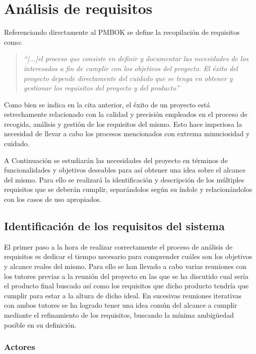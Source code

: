 \chapter{Análisis de requisitos}

Referenciando directamente al PMBOK \cite{pmbok} se define la recopilación de requisitos como:

\begin{quote}
	\textit{
	“[...]el proceso que consiste en definir y documentar las necesidades de los interesados
	a fin de cumplir con los objetivos del proyecto. El éxito del proyecto depende directamente
	del cuidado que se tenga en obtener y gestionar los requisitos del proyecto y del
	producto”
	}
\end{quote}

Como bien se indica en la cita anterior, el éxito de un proyecto está estrechamente relacionado con la calidad y precisión empleados en el proceso de recogida, análisis y gestión de los requisitos del mismo. Esto hace imperiosa la necesidad de llevar a cabo los procesos mencionados con extrema minuciosidad y cuidado.

\bigskip

A Continuación se estudiarán las necesidades del proyecto en términos de funcionalidades y objetivos deseables para así obtener una idea sobre el alcance del mismo. Para ello se realizará la identificación y descripción de los múltiples requisitos que se deberán cumplir, separándolos según su índole y relacionándolos con los casos de uso apropiados.

\section{Identificación de los requisitos del sistema}

El primer paso a la hora de realizar correctamente el proceso de análisis de requisitos es dedicar el tiempo necesario para comprender cuáles son los objetivos y alcance reales del mismo. Para ello se han llevado a cabo varias reuniones con los tutores previas a la reunión del proyecto en las que se ha discutido cual sería el producto final buscado así como los requisitos que dicho producto tendría que cumplir para estar a la altura de dicho ideal. En sucesivas reuniones iterativas con ambos tutores se ha logrado tener una idea común del alcance a cumplir mediante el refinamiento de los requisitos, buscando la mínima ambigüedad posible en su definición.

\subsection{Actores}

